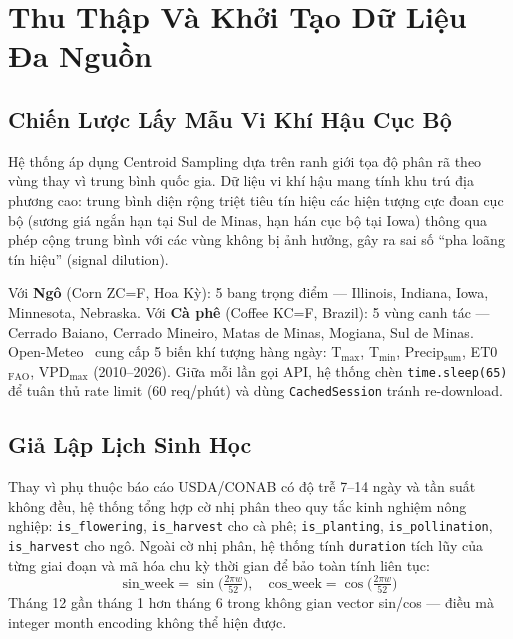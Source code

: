 \documentclass[conference]{IEEEtran}
\begin{document}
\section{Thu Thập Và Khởi Tạo Dữ Liệu Đa Nguồn}

\subsection{Chiến Lược Lấy Mẫu Vi Khí Hậu Cục Bộ}

Hệ thống áp dụng Centroid Sampling dựa trên ranh giới tọa độ phân rã theo
vùng thay vì trung bình quốc gia. Dữ liệu vi khí hậu mang tính khu trú địa
phương cao: trung bình diện rộng triệt tiêu tín hiệu các hiện tượng cực đoan
cục bộ (sương giá ngắn hạn tại Sul de Minas, hạn hán cục bộ tại Iowa) thông
qua phép cộng trung bình với các vùng không bị ảnh hưởng, gây ra sai số
``pha loãng tín hiệu'' (signal dilution).

Với \textbf{Ngô} (Corn ZC=F, Hoa Kỳ): 5 bang trọng điểm — Illinois, Indiana,
Iowa, Minnesota, Nebraska. Với \textbf{Cà phê} (Coffee KC=F, Brazil): 5 vùng
canh tác — Cerrado Baiano, Cerrado Mineiro, Matas de Minas, Mogiana, Sul de
Minas. Open-Meteo~\cite{zippenfenig2023} cung cấp 5 biến khí tượng hàng ngày:
T$_{\max}$, T$_{\min}$, Precip$_\text{sum}$, ET0$_\text{FAO}$, VPD$_{\max}$
(2010--2026). Giữa mỗi lần gọi API, hệ thống chèn \texttt{time.sleep(65)} để
tuân thủ rate limit (60 req/phút) và dùng \texttt{CachedSession} tránh re-download.

\subsection{Giả Lập Lịch Sinh Học}

Thay vì phụ thuộc báo cáo USDA/CONAB có độ trễ 7--14 ngày và tần suất không
đều, hệ thống tổng hợp cờ nhị phân theo quy tắc kinh nghiệm nông nghiệp:
\texttt{is\_flowering}, \texttt{is\_harvest} cho cà phê; \texttt{is\_planting},
\texttt{is\_pollination}, \texttt{is\_harvest} cho ngô. Ngoài cờ nhị phân,
hệ thống tính \texttt{duration} tích lũy của từng giai đoạn và mã hóa chu kỳ
thời gian để bảo toàn tính liên tục:
\begin{equation}
\text{sin\_week} = \sin\!\bigl(\tfrac{2\pi w}{52}\bigr), \quad
\text{cos\_week} = \cos\!\bigl(\tfrac{2\pi w}{52}\bigr)
\end{equation}
Tháng 12 gần tháng 1 hơn tháng 6 trong không gian vector sin/cos — điều mà
integer month encoding không thể hiện được.
\end{document}
